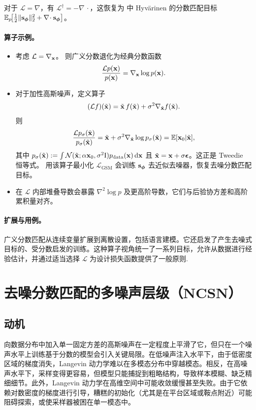 对于 $\mathcal L=\nabla$，有 $\mathcal L^\dagger=-\nabla\!\,\cdot$，这恢复为  中 Hyvärinen 的分数匹配目标 $\mathbb E_p\!\big[\tfrac{1}{2}\|{\mathbf{s}}_{\bm{\phi}}\|_2^2 + \nabla\!\cdot {\mathbf{s}}_{\bm{\phi}}\big]$。

\paragraph{算子示例。}
\begin{itemize}
\item {} 考虑 $\mathcal L = \nabla_{{\mathbf{x}}}$。
则广义分数退化为经典分数函数
\[
\frac{\mathcal L p({\mathbf{x}})}{p({\mathbf{x}})}
= \nabla_{{\mathbf{x}}}\log p({\mathbf{x}}).
\]
\item {}
对于加性高斯噪声，定义算子
\[
(\mathcal L f)(\tilde{{\mathbf{x}}})
= \tilde{{\mathbf{x}}}\,f(\tilde{{\mathbf{x}}}) + \sigma^2\nabla_{\tilde{{\mathbf{x}}}} f(\tilde{{\mathbf{x}}}).
\]
则
\[
\frac{\mathcal L p_\sigma(\tilde{{\mathbf{x}}})}{p_\sigma(\tilde{{\mathbf{x}}})}
= \tilde{{\mathbf{x}}} + \sigma^2\nabla_{\tilde{{\mathbf{x}}}}\log p_\sigma(\tilde{{\mathbf{x}}})
= \mathbb E[{\mathbf{x}}_0|\tilde{{\mathbf{x}}}],
\]
其中 $p_\sigma(\tilde{{\mathbf{x}}}):= \int \mathcal{N}(\tilde{{\mathbf{x}}};\alpha {\mathbf{x}}_0,\sigma^2\mathrm{I})p_{\mathrm{data}}({\mathbf{x}})\mathop{}\!\mathrm{d}{\mathbf{x}}$ 且 $\tilde{{\mathbf{x}}}={\mathbf{x}}+\sigma{\bm{\epsilon}}$。这正是 Tweedie 恒等式。
用该算子最小化 $\mathcal L_{\text{GSM}}$ 会训练 ${\mathbf{s}}_{\bm{\phi}}$ 去近似去噪器，恢复去噪分数匹配目标。


\item {}
在 $\mathcal L$ 内部堆叠导数会暴露 $\nabla^2\log p$ 及更高阶导数，它们与后验协方差和高阶累积量对齐。
\end{itemize}


\paragraph{扩展与用例。}
广义分数匹配从连续变量扩展到离散设置，包括语言建模\citep{meng2022concrete,lou2024discrete}。它还启发了产生去噪式目标的、受分数启发的训练。这种算子视角统一了一系列目标，允许从数据进行经验估计，并通过适当选择 $\mathcal L$ 为设计损失函数提供了一般原则.




\clearpage
\newpage


\section{\texorpdfstring{去噪分数匹配的多噪声层级（NCSN）}{去噪分数匹配的多噪声层级（NCSN）}}\label{sec:SMLD}

\subsection{动机}
向数据分布中加入单一固定方差的高斯噪声在一定程度上平滑了它，但只在一个噪声水平上训练基于分数的模型会引入关键局限。在低噪声注入水平下，由于低密度区域的梯度消失，Langevin 动力学难以在多模态分布中穿越模态。相反，在高噪声水平下，采样变得更容易，但模型只能捕捉到粗略结构，导致样本模糊、缺乏精细细节。此外，Langevin 动力学在高维空间中可能收敛缓慢甚至失败。由于它依赖对数密度的梯度进行引导，糟糕的初始化（尤其是在平台区域或鞍点附近）可能阻碍探索，或使采样器被困在单一模态中。



